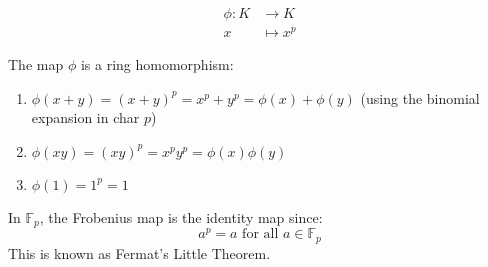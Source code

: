\documentclass{article}
\begin{document}
\begin{align*}
    \phi: K &\to K \\
    x &\mapsto x^p
\end{align*}

\begin{proposition}
The map $\phi$ is a ring homomorphism:
\begin{enumerate}
    \item $\phi(x + y) = (x + y)^p = x^p + y^p = \phi(x) + \phi(y)$ 
        \quad (using the binomial expansion in char $p$)
    \item $\phi(xy) = (xy)^p = x^p y^p = \phi(x)\phi(y)$
    \item $\phi(1) = 1^p = 1$
\end{enumerate}
\end{proposition}

\begin{example}
In $\mathbb{F}_p$, the Frobenius map is the identity map since:
\[ a^p = a \text{ for all } a \in \mathbb{F}_p \]
This is known as Fermat's Little Theorem.
\end{example}
 
 
\end{document}
